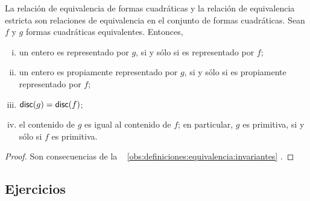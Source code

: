 \begin{teoDefiniciones}\label{teo:definiciones:equivalencia:invariantes}
	La relaci\'on de equivalencia de formas cuadr\'aticas y la
	relaci\'on de equivalencia estricta son relaciones de equivalencia
	en el conjunto de formas cuadr\'aticas.
	Sean $f$ y $g$ formas cuadr\'aticas equivalentes. Entonces,
	\begin{enumerate}[(i)]
		\item\label{item:definiciones:invariantes:representados}
			un entero es representado por $g$, si y s\'olo si
			es representado por $f$;
		\item\label{item:definiciones:invariantes:propiamente}
			un entero es propiamente representado por $g$,
			si y s\'olo si es propiamente representado por $f$;
		\item\label{item:definiciones:invariantes:discriminante}
			$\mathsf{disc}(g)=\mathsf{disc}(f)$;
		\item\label{item:definiciones:invariantes:contenido}
			el contenido de $g$ es igual al contenido de $f$;
			en particular,
			$g$ es primitiva, si y s\'olo si
			$f$ es primitiva.
	\end{enumerate}
\end{teoDefiniciones}

\begin{proof}
	Son consecuencias de la \obsname~%
	\ref{obs:definiciones:equivalencia:invariantes}
	\quedacomoejercicio.
\end{proof}

\subsection*{Ejercicios}


